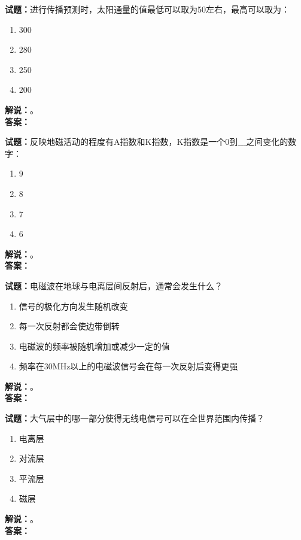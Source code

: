 \documentclass{ctexbook}
\begin{document}
\vspace{\baselineskip}

\noindent\textbf{试题：}进行传播预测时，太阳通量的值最低可以取为50左右，最高可以取为：
\begin{enumerate}[leftmargin=3em]
  \item 300
  \item 280
  \item 250
  \item 200
\end{enumerate}
\noindent\textbf{解说：}\textbf{}。\\\noindent\textbf{答案：}

\vspace{\baselineskip}

\noindent\textbf{试题：}反映地磁活动的程度有A指数和K指数，K指数是一个0到$\_\_\_$之间变化的数字：
\begin{enumerate}[leftmargin=3em]
  \item 9
  \item 8
  \item 7
  \item 6
\end{enumerate}
\noindent\textbf{解说：}\textbf{}。\\\noindent\textbf{答案：}

\vspace{\baselineskip}

\noindent\textbf{试题：}电磁波在地球与电离层间反射后，通常会发生什么？
\begin{enumerate}[leftmargin=3em]
  \item 信号的极化方向发生随机改变
  \item 每一次反射都会使边带倒转
  \item 电磁波的频率被随机增加或减少一定的值
  \item 频率在30\unit{\MHz}以上的电磁波信号会在每一次反射后变得更强
\end{enumerate}
\noindent\textbf{解说：}\textbf{}。\\\noindent\textbf{答案：}

\vspace{\baselineskip}

\noindent\textbf{试题：}大气层中的哪一部分使得无线电信号可以在全世界范围内传播？
\begin{enumerate}[leftmargin=3em]
  \item 电离层
  \item 对流层
  \item 平流层
  \item 磁层
\end{enumerate}
\noindent\textbf{解说：}\textbf{}。\\\noindent\textbf{答案：}
\end{document}
